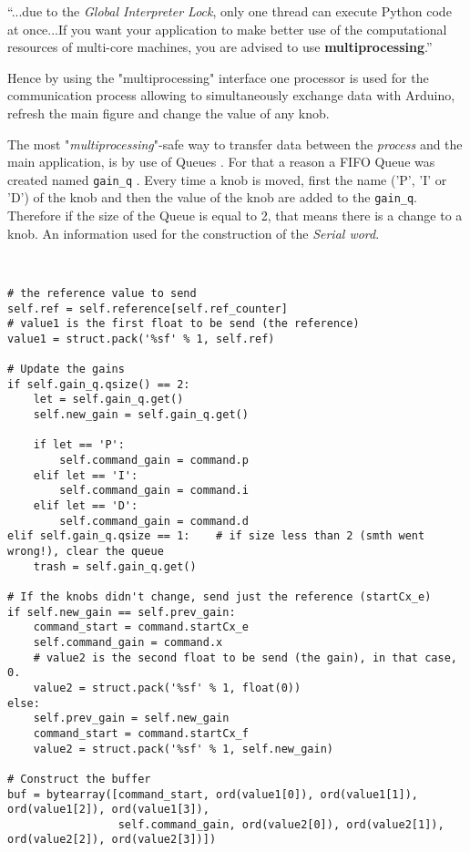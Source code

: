 ``...due to the \textit{Global Interpreter Lock}, only one thread can execute Python code at once...If you want your application to make better use of the computational resources of multi-core machines, you are advised to use \textbf{multiprocessing}.''

Hence by using the "multiprocessing" interface \cite{Multi} one processor is used for the communication process allowing to simultaneously exchange data with Arduino, refresh the main figure and change the value of any knob.

The most "\textit{multiprocessing}"-safe way to transfer data between the \textit{process} and the main application, is by use of Queues \cite{Multi}. For that a reason a FIFO Queue was created named \texttt{gain\_q} . Every time a knob is moved, first the name ('P', 'I' or 'D') of the knob and then the value of the knob are added to the \texttt{gain\_q}. Therefore if the size of the Queue is equal to 2, that means there is a change to a knob. An information used for the construction of the \textit{Serial word}.

\

\begin{lstlisting}[style=My_Python, caption=Construction of Serial word, label=code:Python buffer]
# the reference value to send
self.ref = self.reference[self.ref_counter]
# value1 is the first float to be send (the reference)
value1 = struct.pack('%sf' % 1, self.ref)

# Update the gains
if self.gain_q.qsize() == 2:
    let = self.gain_q.get()
    self.new_gain = self.gain_q.get()

    if let == 'P':
        self.command_gain = command.p
    elif let == 'I':
        self.command_gain = command.i
    elif let == 'D':
        self.command_gain = command.d
elif self.gain_q.qsize == 1:    # if size less than 2 (smth went wrong!), clear the queue
    trash = self.gain_q.get()

# If the knobs didn't change, send just the reference (startCx_e)
if self.new_gain == self.prev_gain:
    command_start = command.startCx_e
    self.command_gain = command.x
    # value2 is the second float to be send (the gain), in that case, 0.
    value2 = struct.pack('%sf' % 1, float(0))
else:
    self.prev_gain = self.new_gain
    command_start = command.startCx_f
    value2 = struct.pack('%sf' % 1, self.new_gain)

# Construct the buffer
buf = bytearray([command_start, ord(value1[0]), ord(value1[1]), ord(value1[2]), ord(value1[3]),
                 self.command_gain, ord(value2[0]), ord(value2[1]), ord(value2[2]), ord(value2[3])])

\end{lstlisting}





